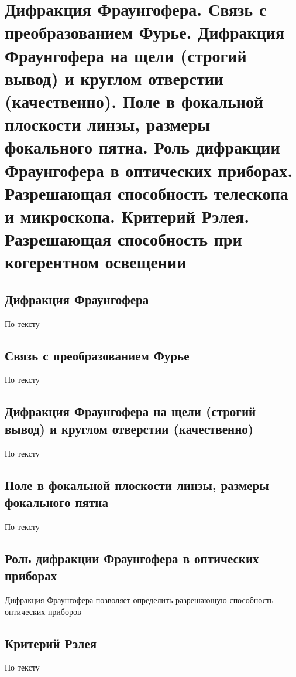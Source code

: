 \documentclass[a4paper, 14pt]{article}
\begin{document}
    \section{Дифракция Фраунгофера.
    Связь с преобразованием Фурье.
    Дифракция Фраунгофера на щели (строгий вывод) и круглом отверстии (качественно).
    Поле в фокальной плоскости линзы, размеры фокального пятна.
    Роль дифракции Фраунгофера в оптических приборах.
    Разрешающая способность телескопа и микроскопа.
    Критерий Рэлея.
    Разрешающая способность при когерентном освещении}
    
    \subsection{Дифракция Фраунгофера}
    
    По тексту
    
    \subsection{Связь с преобразованием Фурье}
    
    По тексту
    
    \subsection{Дифракция Фраунгофера на щели (строгий вывод) и круглом отверстии (качественно)}
    
    По тексту
    
    \subsection{Поле в фокальной плоскости линзы, размеры фокального пятна}
    
    По тексту
    
    \subsection{Роль дифракции Фраунгофера в оптических приборах}
    
    Дифракция Фраунгофера позволяет определить разрешающую способность оптических приборов
    
    \subsection{Критерий Рэлея}
    
    По тексту
    
\end{document}
